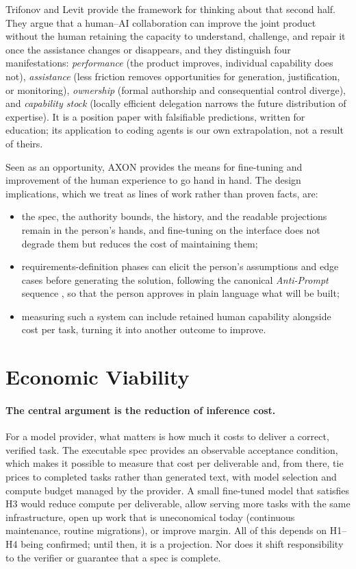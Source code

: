 \documentclass[11pt, a4paper]{article}
\begin{document}
Trifonov and Levit \cite{trifonov2026} provide the framework for thinking about that second half. They argue that a human--AI collaboration can improve the joint product without the human retaining the capacity to understand, challenge, and repair it once the assistance changes or disappears, and they distinguish four manifestations: \emph{performance} (the product improves, individual capability does not), \emph{assistance} (less friction removes opportunities for generation, justification, or monitoring), \emph{ownership} (formal authorship and consequential control diverge), and \emph{capability stock} (locally efficient delegation narrows the future distribution of expertise). It is a position paper with falsifiable predictions, written for education; its application to coding agents is our own extrapolation, not a result of theirs.

Seen as an opportunity, AXON provides the means for fine-tuning and improvement of the human experience to go hand in hand. The design implications, which we treat as lines of work rather than proven facts, are:
\begin{itemize}[nosep]
  \item the spec, the authority bounds, the history, and the readable projections remain in the person's hands, and fine-tuning on the interface does not degrade them but reduces the cost of maintaining them;
  \item requirements-definition phases can elicit the person's assumptions and edge cases before generating the solution, following the canonical \emph{Anti-Prompt} sequence \cite{trifonov2026}, so that the person approves in plain language what will be built;
  \item measuring such a system can include retained human capability alongside cost per task, turning it into another outcome to improve.
\end{itemize}

\section{Economic Viability}

\paragraph{The central argument is the reduction of inference cost.} For a model provider, what matters is how much it costs to deliver a correct, verified task. The executable spec provides an observable acceptance condition, which makes it possible to measure that cost per deliverable and, from there, tie prices to completed tasks rather than generated text, with model selection and compute budget managed by the provider. A small fine-tuned model that satisfies H3 would reduce compute per deliverable, allow serving more tasks with the same infrastructure, open up work that is uneconomical today (continuous maintenance, routine migrations), or improve margin. All of this depends on H1--H4 being confirmed; until then, it is a projection. Nor does it shift responsibility to the verifier or guarantee that a spec is complete.
\end{document}
